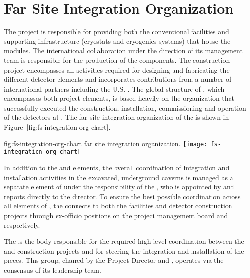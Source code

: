\section{Far Site Integration Organization}
\label{sec:exec-tc-partners}

The  project is responsible for providing both the 
conventional facilities and supporting infrastructure (cryostats 
and cryogenics systems) that house the   
modules.  
The international  
collaboration under the direction of its management team is 
responsible for the production of the  components.  The 
  construction project encompasses all 
activities required for designing and fabricating the different 
detector elements and incorporates contributions from a number 
of international partners including the U.S. .  
The global structure of , which encompasses 
both project elements, is based heavily on 
the organization that successfully executed the construction,
installation, commissioning and operation of the 
detectors at . 
The 
far site integration organization of the  is shown in Figure~\ref{fig:fs-integration-org-chart}. 

\begin{dunefigure}{fig:fs-integration-org-chart}
  { far site integration organization.}
  \texttt{[image: fs-integration-org-chart]} %
\end{dunefigure}

In addition to the  and  elements, the 
overall coordination of integration and installation activities 
in the excavated, underground caverns is managed as a separate
element of  under the responsibility of 
the , who is appointed by and reports directly to the 
 director.  To ensure the best possible coordination 
across all elements of , the  connects 
to both the facilities and detector construction projects through 
ex-officio positions on the  project management board 
and  , respectively.

The  is the body responsible for the required high-level
coordination between the  and  construction 
projects and for steering the integration and 
installation of the  pieces. This group, chaired by the  Project Director and ,  operates via the 
consensus of its leadership team. 

